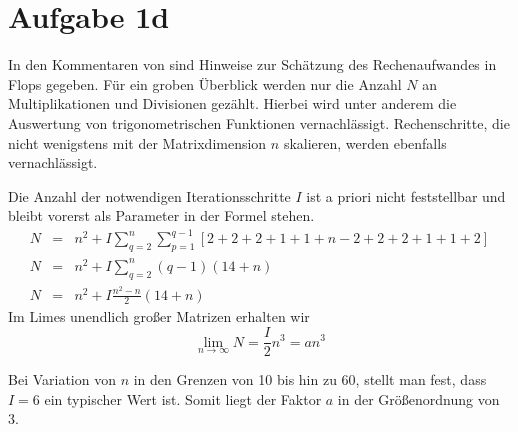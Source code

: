 \section*{Aufgabe 1d}
In den Kommentaren von  sind Hinweise zur Schätzung des
Rechenaufwandes in Flops gegeben. Für ein groben Überblick werden nur die
Anzahl $N$ an Multiplikationen und Divisionen gezählt. Hierbei wird unter anderem die
Auswertung von trigonometrischen Funktionen vernachlässigt. Rechenschritte,
die nicht wenigstens mit der Matrixdimension $n$ skalieren, werden ebenfalls
vernachlässigt.

Die Anzahl der notwendigen Iterationsschritte $I$ ist a priori nicht feststellbar
und bleibt vorerst als Parameter in der Formel stehen.
\begin{eqnarray*}
 N &=& n^2 + I \sum^{n}_{q=2} \sum^{q-1}_{p=1} \left[ 2+2+2+1+1+n-2+2+2+1+1+2 \right] \\
 N &=& n^2 + I \sum^{n}_{q=2} (q-1)(14+n) \\
 N &=& n^2 + I \frac{n^2-n}{2}(14+n)
\end{eqnarray*}
Im Limes unendlich großer Matrizen erhalten wir
\begin{equation*}
 \lim_{n \to \infty} N = \frac{I}{2}n^3 = a n^3
\end{equation*}

Bei Variation von $n$ in den Grenzen von 10 bis hin zu 60, stellt man
fest, dass  $I = 6$ ein typischer Wert ist. Somit liegt der Faktor $a$
in der Größenordnung von 3.